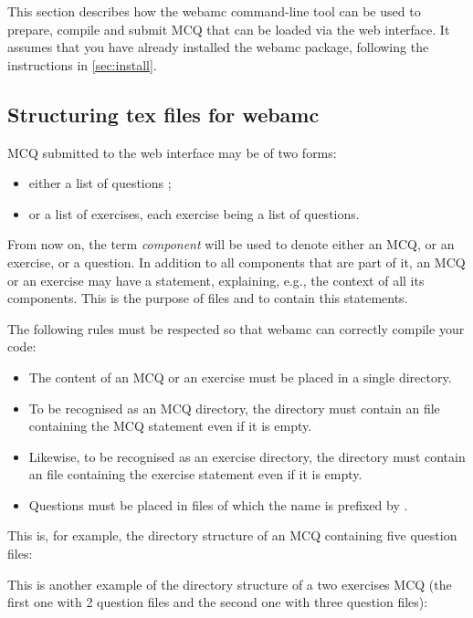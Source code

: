 This section describes how the webamc command-line tool can be used to
prepare, compile and submit MCQ that can be loaded via the web
interface. It assumes that you have already installed the webamc
package, following the instructions in \cref{sec:install}.
\subsection{Structuring tex files for webamc}
\label{subsec:submission/structuring}
MCQ submitted to the web interface may be of two forms:
\begin{itemize}
\item either a list of questions ;
\item or a list of exercises, each exercise being a list of questions.
\end{itemize}
From now on, the term {\em component} will be used to denote either an
MCQ, or an exercise, or a question. In addition to all components that
are part of it, an MCQ or an exercise may have a statement,
explaining, e.g., the context of all its components. This is the
purpose of files  and  to contain
this statements.

The following rules must be respected so that webamc can correctly
compile your code:
\begin{itemize}
\item The content of an MCQ or an exercise must be placed in a single
  directory.
\item To be recognised as an MCQ directory, the directory must contain
  an  file containing the MCQ statement even if it is
  empty.
\item Likewise, to be recognised as an exercise directory, the
  directory must contain an  file containing the
  exercise statement even if it is empty.
\item Questions must be placed in files of which the name is prefixed
  by .
\end{itemize}

This is, for example, the directory structure of an MCQ containing
five question files:
\begin{mdframed}[style=defaultstyle]
\end{mdframed}

This is another example of the directory structure of a two exercises
MCQ (the first one with 2 question files and the second one with three
question files):
\begin{mdframed}[style=defaultstyle]
\end{mdframed}

